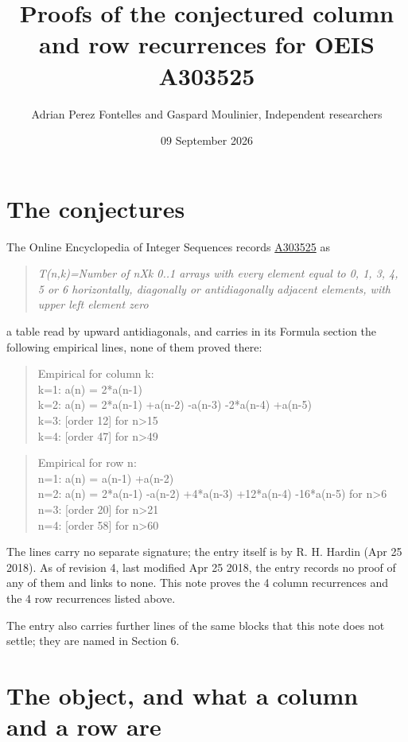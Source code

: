 \documentclass[11pt]{article}
\title{Proofs of the conjectured column and row recurrences for OEIS A303525}
\author{Adrian Perez Fontelles and Gaspard Moulinier, Independent researchers}
\date{09 September 2026}
\theoremstyle{definition}
\begin{document}
\maketitle
\section{The conjectures}

The Online Encyclopedia of Integer Sequences records \href{https://oeis.org/A303525}{A303525} as

\begin{quote}\itshape T(n,k)=Number of nXk 0..1 arrays with every element equal to 0, 1, 3, 4, 5 or 6 horizontally, diagonally or antidiagonally adjacent elements, with upper left element zero\end{quote}

a table read by upward antidiagonals, and carries in its Formula section the following empirical lines, none of them proved there:

\begin{quote}\ttfamily Empirical for column k:\\
k=1: a(n) = 2*a(n-1)\\k=2: a(n) = 2*a(n-1) +a(n-2) -a(n-3) -2*a(n-4) +a(n-5)\\k=3: [order 12] for n>15\\k=4: [order 47] for n>49\end{quote}

\begin{quote}\ttfamily Empirical for row n:\\
n=1: a(n) = a(n-1) +a(n-2)\\n=2: a(n) = 2*a(n-1) -a(n-2) +4*a(n-3) +12*a(n-4) -16*a(n-5) for n>6\\n=3: [order 20] for n>21\\n=4: [order 58] for n>60\end{quote}

The lines carry no separate signature; the entry itself is by R. H. Hardin (Apr 25 2018). As of revision 4, last modified Apr 25 2018, the entry records no proof of any of them and links to none. This note proves the 4 column recurrences and the 4 row recurrences listed above.

The entry also carries further lines of the same blocks that this note does not settle; they are named in Section 6.

\section{The object, and what a column and a row are}
\end{document}
